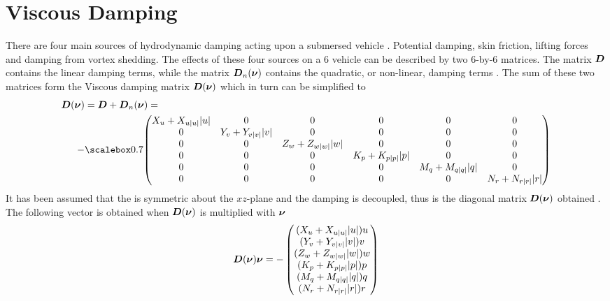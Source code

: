 \section{Viscous Damping}
There are four main sources of hydrodynamic damping acting upon a submersed vehicle \citep[p. 122]{fossen2011}.
Potential damping, skin friction, lifting forces and damping from vortex shedding. The effects of these four sources on a 6 \abbrDOF vehicle can be described by two 6-by-6 matrices.
The matrix $\boldsymbol{D}$ contains the linear damping terms, while the matrix $\boldsymbol{D}_{n}(\boldsymbol{\nu})$ contains the quadratic, or non-linear, damping terms \citep{fossen2011}. The sum of these two matrices form the Viscous damping matrix $\boldsymbol{D}(\boldsymbol{\nu})$ which in turn can be simplified to
\begin{equation}
\begin{split}
    \damping(\nuVector) &= \damping + \damping_{n}(\nuVector) = \\
    -& \scalemath{0.7}{\begin{pmatrix}
        \Xu+\Xuabsu\abs{u} & 0 & 0 & 0 & 0 & 0 \\
        0 & \Yv+\Yvabsv\abs{v} & 0 & 0 & 0 & 0 \\
        0 & 0 & \Zw+\Zwabsw\abs{w} & 0 & 0 & 0 \\
        0 & 0 & 0 & \Kp+\Kpabsp\abs{p} & 0 & 0 \\
        0 & 0 & 0 & 0 & \Mq+\Mqabsq\abs{q} & 0 \\
        0 & 0 & 0 & 0 & 0 & \Nr+\Nrabsr\abs{r} \\
    \end{pmatrix}}
\end{split}
\end{equation}
It has been assumed that the \abbrROV is symmetric about the $xz$-plane and the damping is decoupled, thus is the diagonal matrix $\boldsymbol{D}(\boldsymbol{\nu})$ obtained \citep[p. 129-130]{fossen2011}. The following vector is obtained when $\boldsymbol{D}(\boldsymbol{\nu})$ is multiplied with $\boldsymbol{\nu}$
\begin{equation}
    \boldsymbol{D}(\boldsymbol{\nu}) \boldsymbol{\nu} =
     -\begin{pmatrix}
    (X_{u} + X_{u|u|} |u|) u\\
    (Y_{v} + Y_{v|v|} |v|) v\\
    (Z_{w} + Z_{w|w|} |w|) w\\
    (K_{p} + K_{p|p|} |p|) p\\
    (M_{q} + M_{q|q|} |q|) q\\
    (N_{r} + N_{r|r|} |r|) r\\
    \end{pmatrix}    
\end{equation}

